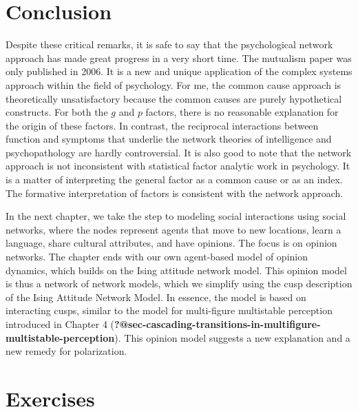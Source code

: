 \documentclass[
  a4paper,
  DIV=11,
  numbers=noendperiod,
  oneside]{scrreprt}
\begin{document}
\hypertarget{sec-Conclusion}{%
\section{Conclusion}\label{sec-Conclusion}}

Despite these critical remarks, it is safe to say that the psychological
network approach has made great progress in a very short time. The
mutualism paper was only published in 2006. It is a new and unique
application of the complex systems approach within the field of
psychology. For me, the common cause approach is theoretically
unsatisfactory because the common causes are purely hypothetical
constructs. For both the \(g\) and \(p\) factors, there is no reasonable
explanation for the origin of these factors. In contrast, the reciprocal
interactions between function and symptoms that underlie the network
theories of intelligence and psychopathology are hardly controversial.
It is also good to note that the network approach is not inconsistent
with statistical factor analytic work in psychology. It is a matter of
interpreting the general factor as a common cause or as an index. The
formative interpretation of factors is consistent with the network
approach.

In the next chapter, we take the step to modeling social interactions
using social networks, where the nodes represent agents that move to new
locations, learn a language, share cultural attributes, and have
opinions. The focus is on opinion networks. The chapter ends with our
own agent-based model of opinion dynamics, which builds on the Ising
attitude network model. This opinion model is thus a network of network
models, which we simplify using the cusp description of the Ising
Attitude Network Model. In essence, the model is based on interacting
cusps, similar to the model for multi-figure multistable perception
introduced in Chapter 4
(\textbf{?@sec-cascading-transitions-in-multifigure-multistable-perception}).
This opinion model suggests a new explanation and a new remedy for
polarization.

\hypertarget{sec-Exercises}{%
\section{Exercises}\label{sec-Exercises}}
\end{document}
